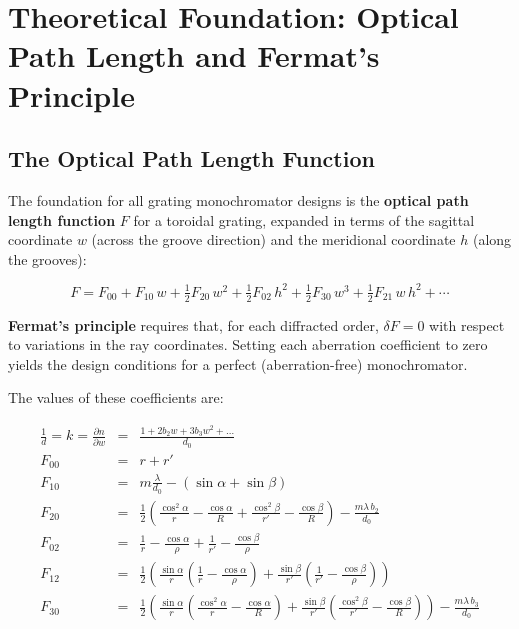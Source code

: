 \documentclass[12pt,a4paper]{article}
\newcommand{\placeholder}[4][\linewidth]{%
  \begin{figure}[H]
    \centering
    \begin{tikzpicture}
      \draw[fill=plbg, draw=plframe, line width=1pt, dashed]
            (0,0) rectangle (#1, #2);
      \draw[plframe, line width=0.4pt] (0,0) -- (#1,#2);
      \draw[plframe, line width=0.4pt] (#1,0) -- (0,#2);
      \node[anchor=north west, font=\small\bfseries\color{plframe},
            inner sep=4pt] at (0,#2) {#3};
      \node[anchor=center, font=\small\itshape\color{pltext},
            text width=0.75\linewidth, align=center]
            at ({0.5*#1},{0.5*#2}) {#4};
    \end{tikzpicture}
  \end{figure}
}
\begin{document}

\section{Theoretical Foundation: Optical Path Length and Fermat's Principle}

\subsection{The Optical Path Length Function}

The foundation for all grating monochromator designs is the \textbf{optical path length
function} $F$ for a toroidal grating, expanded in terms of the sagittal coordinate $w$
(across the groove direction) and the meridional coordinate $h$ (along the grooves):

\begin{equation}
  F = F_{00} + F_{10}\,w
    + \tfrac{1}{2}F_{20}\,w^2
    + \tfrac{1}{2}F_{02}\,h^2
    + \tfrac{1}{2}F_{30}\,w^3
    + \tfrac{1}{2}F_{21}\,w\,h^2
    + \cdots
  \label{eq:OPL}
\end{equation}

\textbf{Fermat's principle} requires that, for each diffracted order, $\delta F = 0$ with
respect to variations in the ray coordinates.  Setting each aberration coefficient to zero
yields the design conditions for a perfect (aberration-free) monochromator.

The values of these coefficients are:

\begin{eqnarray}
\frac{1}{d} = k = \frac{\partial n}{\partial w} &=& \frac{1 + 2b_2 w + 3b_3 w^2 + \ldots}{d_0} \\[10pt]
F_{00} &=& r + r' \\[10pt]
F_{10} &=& m\frac{\lambda}{d_0} - (\sin\alpha + \sin\beta) \\[10pt]
F_{20} &=& \frac{1}{2}\left(\frac{\cos^2\alpha}{r} - \frac{\cos\alpha}{R} + \frac{\cos^2\beta}{r'} - \frac{\cos\beta}{R}\right) - \frac{m\lambda\, b_2}{d_0} \\[10pt]
F_{02} &=& \frac{1}{r} - \frac{\cos\alpha}{\rho} + \frac{1}{r'} - \frac{\cos\beta}{\rho} \\[10pt]
F_{12} &=&  \frac{1}{2}\left(\frac{\sin\alpha}{r}\left(\frac{1}{r} - \frac{\cos\alpha}{\rho}\right) + \frac{\sin\beta}{r'}\left(\frac{1}{r'} - \frac{\cos\beta}{\rho}\right)\right)
\\[10pt]
F_{30} &=& \frac{1}{2}\left(\frac{\sin\alpha}{r}\left(\frac{\cos^2\alpha}{r} - \frac{\cos\alpha}{R}\right) + \frac{\sin\beta}{r'}\left(\frac{\cos^2\beta}{r'} - \frac{\cos\beta}{R}\right)\right) - \frac{m\lambda\, b_3}{d_0}
\end{eqnarray}
\end{document}
